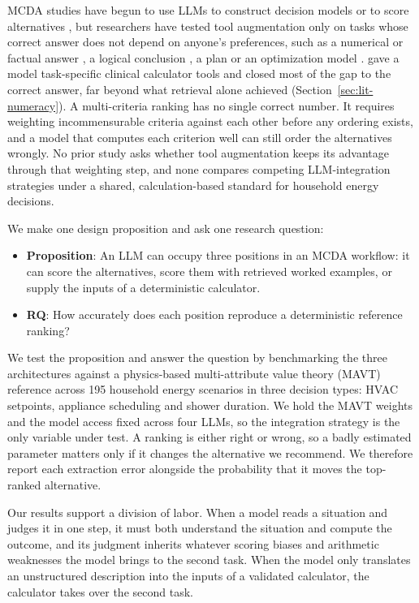 \documentclass[final,3p,times]{elsarticle}
\begin{document}
MCDA studies have begun to use LLMs to construct decision models or to score alternatives \cite{svoboda2024,icaart26}, but researchers have tested tool augmentation only on tasks whose correct answer does not depend on anyone's preferences, such as a numerical or factual answer \cite{gao2023pal,schick2023toolformer}, a logical conclusion \cite{pan2023logiclm}, a plan \cite{liu2023llmp} or an optimization model \cite{ramamonjison2023nl4opt,ahmaditeshnizi2024optimus}. \citet{goodell2025} gave a model task-specific clinical calculator tools and closed most of the gap to the correct answer, far beyond what retrieval alone achieved (Section~\ref{sec:lit-numeracy}). A multi-criteria ranking has no single correct number. It requires weighting incommensurable criteria against each other before any ordering exists, and a model that computes each criterion well can still order the alternatives wrongly. No prior study asks whether tool augmentation keeps its advantage through that weighting step, and none compares competing LLM-integration strategies under a shared, calculation-based standard for household energy decisions.

We make one design proposition and ask one research question:
\begin{itemize}
\item \textbf{Proposition}: An LLM can occupy three positions in an MCDA workflow: it can score the alternatives, score them with retrieved worked examples, or supply the inputs of a deterministic calculator.
\item \textbf{RQ}: How accurately does each position reproduce a deterministic reference ranking?
\end{itemize}

We test the proposition and answer the question by benchmarking the three architectures against a physics-based multi-attribute value theory (MAVT) reference across 195 household energy scenarios in three decision types: HVAC setpoints, appliance scheduling and shower duration. We hold the MAVT weights and the model access fixed across four LLMs, so the integration strategy is the only variable under test. A ranking is either right or wrong, so a badly estimated parameter matters only if it changes the alternative we recommend. We therefore report each extraction error alongside the probability that it moves the top-ranked alternative.

Our results support a division of labor. When a model reads a situation and judges it in one step, it must both understand the situation and compute the outcome, and its judgment inherits whatever scoring biases and arithmetic weaknesses the model brings to the second task. When the model only translates an unstructured description into the inputs of a validated calculator, the calculator takes over the second task.
\end{document}
